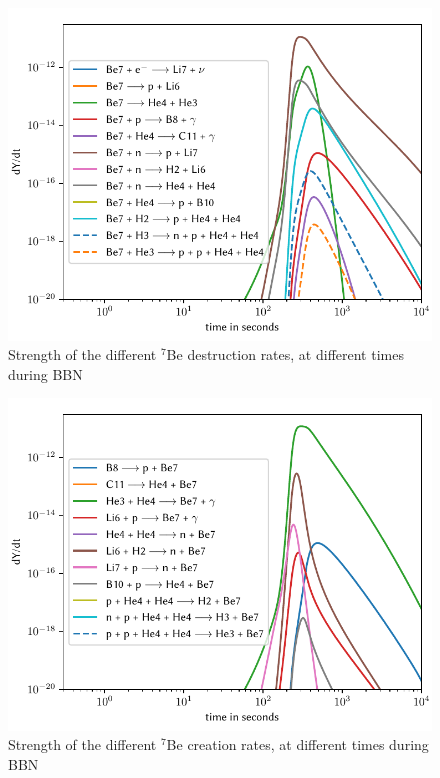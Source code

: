 \begin{figure}[ht]
    \includegraphics[width=5.1in]{figures/app/Be7destruct.pdf}
    \caption{Strength of the different ${}^7$Be destruction rates, at different times during BBN}
    \label{fig:Be7destruct}
\end{figure}

\begin{figure}[ht]
    \includegraphics[width=5.1in]{figures/app/Be7create.pdf}
    \caption{Strength of the different ${}^7$Be creation rates, at different times during BBN}
    \label{fig:Be7create}
\end{figure}
